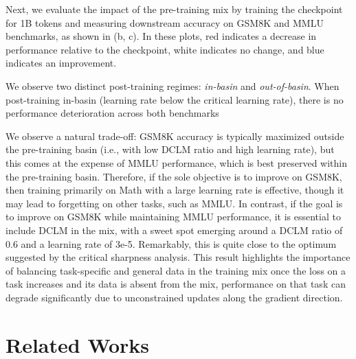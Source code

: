 \documentclass[]{fairmeta}
\theoremstyle{plain}
\theoremstyle{definition}
\begin{document}
Next, we evaluate the impact of the pre-training mix by training the checkpoint for 1B tokens and measuring downstream accuracy on GSM8K and MMLU benchmarks, as shown in (b, c). In these plots, red indicates a decrease in performance relative to the checkpoint, white indicates no change, and blue indicates an improvement. 

We observe two distinct post-training regimes: \emph{in-basin} and \emph{out-of-basin}. When post-training in-basin (learning rate below the critical learning rate), there is no performance deterioration across both benchmarks

We observe a natural trade-off: GSM8K accuracy is typically maximized outside the pre-training basin (i.e., with low DCLM ratio and high learning rate), but this comes at the expense of MMLU performance, which is best preserved within the pre-training basin. Therefore, if the sole objective is to improve on GSM8K, then training primarily on Math with a large learning rate is effective, though it may lead to forgetting on other tasks, such as MMLU. In contrast, if the goal is to improve on GSM8K while maintaining MMLU performance, it is essential to include DCLM in the mix, with a sweet spot emerging around a DCLM ratio of $0.6$ and a learning rate of 3e-5. Remarkably, this is quite close to the optimum suggested by the critical sharpness analysis. This result highlights the importance of balancing task-specific and general data in the training mix \textemdash once the loss on a task increases and its data is absent from the mix, performance on that task can degrade significantly due to unconstrained updates along the gradient direction.


\section{Related Works}


    
\end{document}
